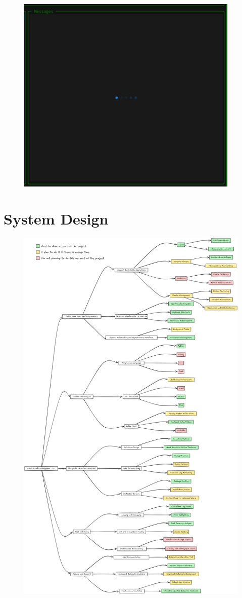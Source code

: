 \documentclass[10pt , a4paper]{report}
\begin{document}
\begin{figure}[htbp]
  \begin{center}
    \includegraphics[width=0.95\textwidth]{imgs/MessagesSpinner.png}
  \end{center}
  \caption{}\label{fig:}
\end{figure}



\appendix
\chapter{System Design}\label{appendix:system_design}
\begin{figure}[htpb]
    \centering
    \includegraphics[width=0.7\linewidth]{imgs/SystemDesign.png}
\end{figure}
\end{document}
